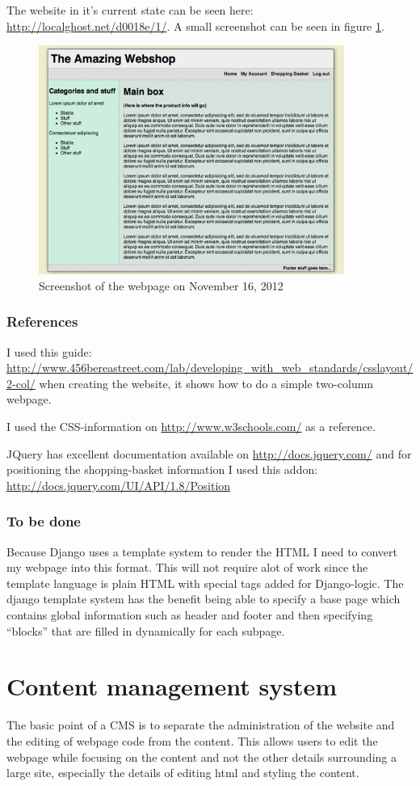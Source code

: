 \documentclass[12pt, a4paper,titlepage]{article}
\begin{document}
The website in it's current state can be seen here: \url{http://localghost.net/d0018e/1/}. 
A small screenshot can be seen in figure \ref{fig:sshot}.
\begin{figure}
\centering
\includegraphics[width=10cm]{Screenshot_2012-11-16.png}
\caption{Screenshot of the webpage on November 16, 2012}
\label{fig:sshot}
\end{figure}

\subsubsection{References}
I used this guide:
\url{http://www.456bereastreet.com/lab/developing_with_web_standards/csslayout/2-col/}
when creating the website, it shows how to do a simple two-column webpage.

I used the CSS-information on \url{http://www.w3schools.com/} as a reference.

JQuery has excellent documentation available on \url{http://docs.jquery.com/}
and for positioning the shopping-basket information I used this addon: 
\url{http://docs.jquery.com/UI/API/1.8/Position}

\subsubsection{To be done}
Because Django uses a template system to render the HTML I need to 
convert my webpage into this format. 
This will not require alot of work since the template language is plain 
HTML with special tags added for Django-logic.
The django template system has the benefit being able to specify a base page
which contains global information such as header and footer and then
specifying ``blocks'' that are filled in dynamically for each subpage.


\section{Content management system}
The basic point of a CMS is to separate the administration of the website and
the editing of webpage code from the content. This allows users to edit the
webpage while focusing on the content and not the other details surrounding
a large site, especially the details of editing html and styling the content.
\end{document}
